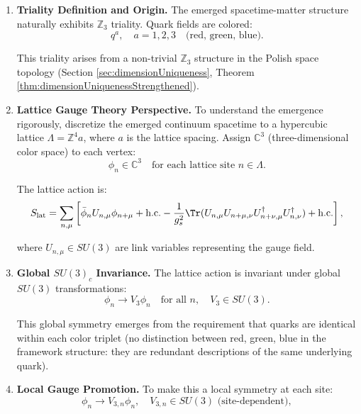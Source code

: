 \begin{enumerate}
\item \textbf{Triality Definition and Origin.} The emerged spacetime-matter structure naturally exhibits $\mathbb{Z}_3$ triality. Quark fields are colored:
\begin{equation}
q^a, \quad a = 1, 2, 3 \quad \text{(red, green, blue)}.
\end{equation}

This triality arises from a non-trivial $\mathbb{Z}_3$ structure in the Polish space topology (Section \ref{sec:dimensionUniqueness}, Theorem \ref{thm:dimensionUniquenessStrengthened}).

\item \textbf{Lattice Gauge Theory Perspective.} To understand the emergence rigorously, discretize the emerged continuum spacetime to a hypercubic lattice $\Lambda = \mathbb{Z}^4 a$, where $a$ is the lattice spacing. Assign $\mathbb{C}^3$ (three-dimensional color space) to each vertex:
\begin{equation}
\phi_n \in \mathbb{C}^3 \quad \text{for each lattice site } n \in \Lambda.
\end{equation}

The lattice action is:
\begin{equation}
\label{eq:latticeAction}
S_{\text{lat}} = \sum_{n, \mu} \left[\bar{\phi}_n U_{n,\mu} \phi_{n+\mu} + \text{h.c.} - \frac{1}{g_s^2}\Tr(U_{n,\mu} U_{n+\mu,\nu} U_{n+\nu,\mu}^\dagger U_{n,\nu}^\dagger) + \text{h.c.}\right],
\end{equation}

where $U_{n,\mu} \in SU(3)$ are link variables representing the gauge field.

\item \textbf{Global $SU(3)_c$ Invariance.} The lattice action is invariant under global $SU(3)$ transformations:
\begin{equation}
\phi_n \to V_3 \phi_n \quad \text{for all } n, \quad V_3 \in SU(3).
\end{equation}

This global symmetry emerges from the requirement that quarks are identical within each color triplet (no distinction between red, green, blue in the framework structure: they are redundant descriptions of the same underlying quark).

\item \textbf{Local Gauge Promotion.} To make this a local symmetry at each site:
\begin{equation}
\phi_n \to V_{3,n} \phi_n, \quad V_{3,n} \in SU(3) \text{ (site-dependent)},
\end{equation}


\end{enumerate}
